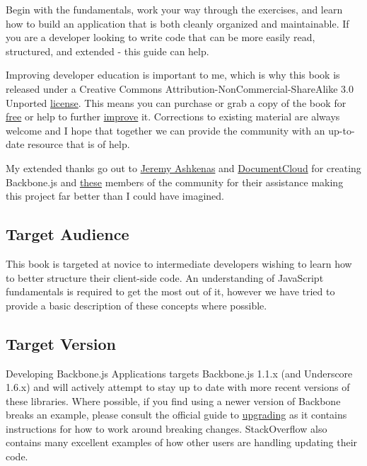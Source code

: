 \documentclass[9pt]{book}
\begin{document}
Begin with the fundamentals, work your way through the exercises, and
learn how to build an application that is both cleanly organized and
maintainable. If you are a developer looking to write code that can be
more easily read, structured, and extended - this guide can help.

Improving developer education is important to me, which is why this book
is released under a Creative Commons
Attribution-NonCommercial-ShareAlike 3.0 Unported
\href{http://creativecommons.org/licenses/by-nc-sa/3.0/}{license}. This
means you can purchase or grab a copy of the book for
\href{http://addyosmani.github.com/backbone-fundamentals/}{free} or help
to further
\href{https://github.com/addyosmani/backbone-fundamentals/}{improve} it.
Corrections to existing material are always welcome and I hope that
together we can provide the community with an up-to-date resource that
is of help.

My extended thanks go out to \href{https://github.com/jashkenas}{Jeremy
Ashkenas} and \href{http://www.documentcloud.org}{DocumentCloud} for
creating Backbone.js and
\href{https://github.com/addyosmani/backbone-fundamentals/contributors}{these}
members of the community for their assistance making this project far
better than I could have imagined.

\subsection{Target Audience}\label{target-audience}

This book is targeted at novice to intermediate developers wishing to
learn how to better structure their client-side code. An understanding
of JavaScript fundamentals is required to get the most out of it,
however we have tried to provide a basic description of these concepts
where possible.


\subsection{Target Version}\label{target-version}

Developing Backbone.js Applications targets Backbone.js 1.1.x (and
Underscore 1.6.x) and will actively attempt to stay up to date with more
recent versions of these libraries. Where possible, if you find using a
newer version of Backbone breaks an example, please consult the official
guide to \href{http://backbonejs.org/\#upgrading}{upgrading} as it
contains instructions for how to work around breaking changes.
StackOverflow also contains many excellent examples of how other users
are handling updating their code.
\end{document}
